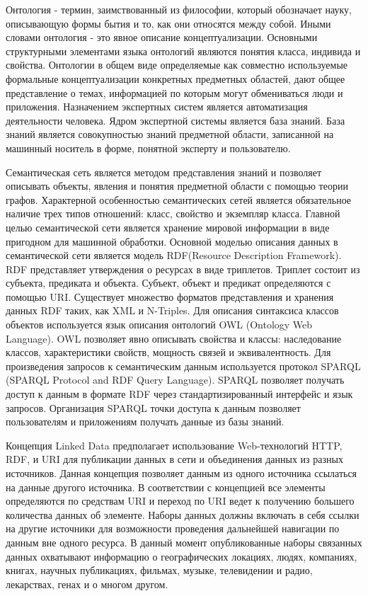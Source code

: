 Онтология - термин, заимствованный из философии, который обозначает науку, описывающую формы бытия и то, как они относятся между собой. Иными словами онтология - это явное описание концептуализации. Основными структурными элементами языка онтологий являются понятия класса, индивида и свойства. Онтологии в общем виде определяемые как совместно используемые формальные концептуализации конкретных предметных областей, дают общее представление о темах, информацией по которым могут обмениваться люди и приложения. Назначением экспертных систем является автоматизация деятельности человека. Ядром экспертной системы является база знаний. База знаний является совокупностью  знаний предметной области, записанной на машинный носитель в форме, понятной эксперту и пользователю.

Семантическая сеть является  методом представления знаний и позволяет описывать объекты, явления и понятия предметной области с помощью теории графов. Характерной особенностью семантических сетей является обязательное наличие трех типов отношений: класс, свойство и экземпляр класса. Главной целью семантической сети является хранение мировой информации в виде пригодном для машинной обработки. Основной моделью описания данных в семантической сети является модель RDF(Resource Description Framework).  RDF представляет утверждения о ресурсах в виде триплетов. Триплет состоит из субъекта, предиката и объекта. Субъект, объект и предикат определяются с помощью URI. Существует множество форматов представления и хранения данных RDF таких, как XML и N-Triples. Для описания синтаксиса классов объектов используется язык описания онтологий OWL (Ontology Web Language). OWL позволяет явно описывать свойства и классы: наследование классов, характеристики свойств, мощность связей и эквивалентность. Для произведения запросов к семантическим данным используется протокол SPARQL (SPARQL Protocol and RDF Query Language). SPARQL позволяет получать доступ к данным в формате RDF через стандартизированный интерфейс и язык запросов. Организация SPARQL точки доступа к данным позволяет пользователям и приложениям получать данные из базы знаний.

Концепция Linked Data предполагает использование Web-технологий HTTP, RDF, и URI для публикации данных в сети и объединения данных из разных источников. Данная концепция позволяет данным из одного источника ссылаться на данные другого источника. В соответствии с концепцией все элементы определяются по средствам URI и переход по URI ведет к получению большего количества данных об элементе. Наборы данных должны включать в себя ссылки на другие источники для возможности проведения дальнейшей навигации по данным вне одного ресурса. В данный момент опубликованные наборы связанных данных охватывают информацию о географических локациях, людях, компаниях, книгах, научных публикациях, фильмах, музыке, телевидении и радио, лекарствах, генах и о многом другом.

